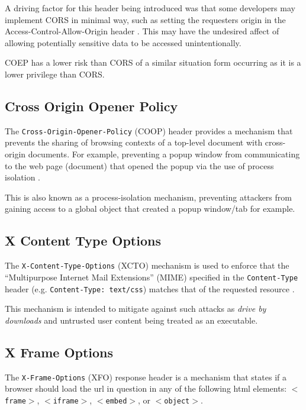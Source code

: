 \documentclass{mscreport}
\begin{document}
\vspace{0.3cm} \noindent
A driving factor for this header being introduced was that some developers may implement CORS in minimal way, such as setting the requesters origin in the Access-Control-Allow-Origin header \cite{noauthor_undated-cr}. This may have the undesired affect of allowing potentially sensitive data to be accessed unintentionally.

\vspace{0.3cm} \noindent
COEP has a lower risk than CORS of a similar situation form occurring as it is a lower privilege than CORS.


\subsection{Cross Origin Opener Policy}
The \texttt{Cross-Origin-Opener-Policy} (COOP) header provides a mechanism that prevents the sharing of browsing contexts of a top-level document with cross-origin documents. For example, preventing a popup window from communicating to the web page (document) that opened the popup via the use of process isolation \cite{Apple_undated-gj}.

\vspace{0.3cm} \noindent
This is also known as a process-isolation mechanism, preventing attackers from gaining access to a global object that created a popup window/tab for example.


\subsection{X Content Type Options}
The \texttt{X-Content-Type-Options} (XCTO) mechanism is used to enforce that the ``Multipurpose Internet Mail Extensions'' (MIME) specified in the \texttt{Content-Type} header (e.g. \newline 
\texttt{Content-Type: text/css}) matches that of the requested resource \cite{Apple_undated-hz}.

\vspace{0.3cm} \noindent
This mechanism is intended to mitigate against such attacks as \textit{drive by downloads} and untrusted user content being treated as an executable.


\subsection{X Frame Options}
The \texttt{X-Frame-Options} (XFO) response header is a mechanism that states if a browser should load the url in question in any of the following html elements: \texttt{$<$frame$>$}, \texttt{$<$iframe$>$}, \texttt{$<$embed$>$}, or \texttt{$<$object$>$}.
\end{document}
